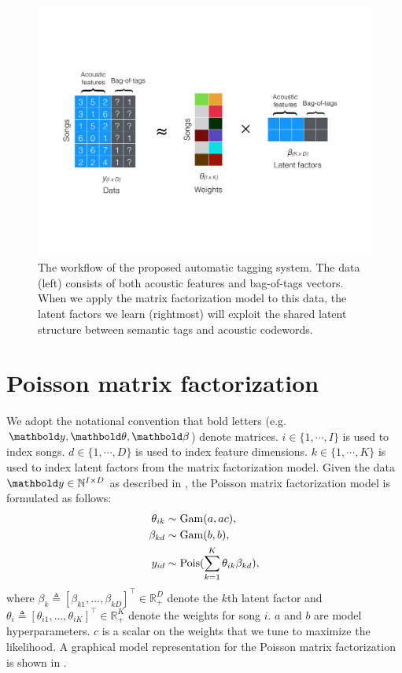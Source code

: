 \begin{figure}
  \centering
    \includegraphics[width=\textwidth]{fig/pmf_tagging}
      \caption{The workflow of the proposed automatic tagging system. The data (left) consists of both acoustic features and bag-of-tags vectors. When we apply the matrix factorization model to this data, the latent factors we learn (rightmost) will exploit the shared latent structure between semantic tags and acoustic codewords.}
      \label{chpt:tagging:fig:cartoon}
\end{figure}

\section{Poisson matrix factorization}\label{chpt:tagging:sec:pmf}
We adopt the notational convention that bold letters (e.g. $\mb{y}, \mb{\theta}, \mb{\beta}$) denote matrices. $i \in \{1, \cdots, I\}$ is used to index songs. $d \in \{1, \cdots, D\}$ is used to index feature dimensions. $k \in \{1, \cdots, K\}$ is used to index latent factors from the matrix factorization model. Given the data $\mb{y}\in \mathbb{N}^{I\times D}$ as described in , the Poisson matrix factorization model is formulated as follows:
\begin{equation} \label{chpt:tagging:eq:model} 
\begin{split}
\theta_{ik} &\sim \mathrm{Gam}(a, ac),\\
\beta_{kd} &\sim \mathrm{Gam}(b, b),\\
y_{id} &\sim \mathrm{Pois}( \sum_{k=1}^K \theta_{ik} \beta_{kd}),
\end{split}
\end{equation}
where $\beta_k \triangleq [\beta_{k1}, \dots, \beta_{kD}]^\top \in \mathbb{R}_+^{D}$ denote the $k$th latent factor and $\theta_i \triangleq [\theta_{i1}, \dots, \theta_{iK}]^\top \in \mathbb{R}_{+}^{K}$ denote the weights for song $i$. $a$ and $b$ are model hyperparameters. $c$ is a scalar on the weights that we tune to maximize the likelihood. A graphical model representation for the Poisson matrix factorization is shown in .

